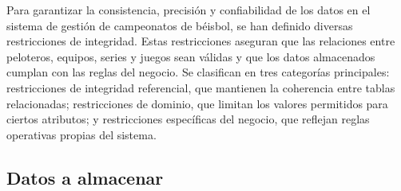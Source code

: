 \documentclass{report}
\begin{document}
    Para garantizar la consistencia, precisión y confiabilidad de los datos en el sistema de gestión de campeonatos 
    de béisbol, se han definido diversas restricciones de integridad. Estas restricciones aseguran que las 
    relaciones entre peloteros, equipos, series y juegos sean válidas y que los datos almacenados cumplan con las 
    reglas del negocio. Se clasifican en tres categorías principales: restricciones de integridad referencial, que 
    mantienen la coherencia entre tablas relacionadas; restricciones de dominio, que limitan los valores permitidos 
    para ciertos atributos; y restricciones específicas del negocio, que reflejan reglas operativas propias del 
    sistema.

    \subsection*{Datos a almacenar}
    
\end{document}
